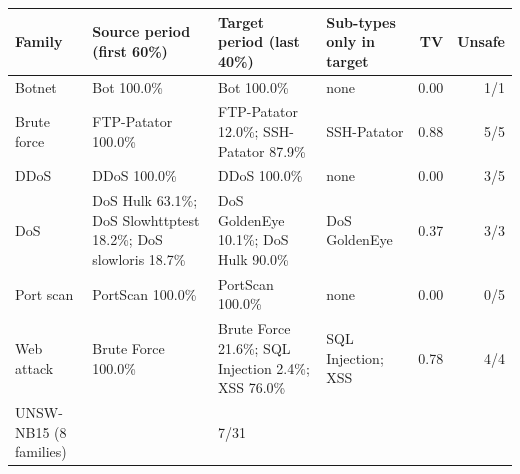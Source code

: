 \begin{tabular}{l>{\raggedright}p{3.2cm}>{\raggedright}p{4.0cm}>{\raggedright}p{2.6cm}rr}
\toprule
Family & Source period (first 60\%) & Target period (last 40\%) & Sub-types only in target & TV & Unsafe \\
\midrule
Botnet & Bot 100.0\% & Bot 100.0\% & none & 0.00 & 1/1 \\
Brute force & FTP-Patator 100.0\% & FTP-Patator 12.0\%; SSH-Patator 87.9\% & SSH-Patator & 0.88 & 5/5 \\
DDoS & DDoS 100.0\% & DDoS 100.0\% & none & 0.00 & 3/5 \\
DoS & DoS Hulk 63.1\%; DoS Slowhttptest 18.2\%; DoS slowloris 18.7\% & DoS GoldenEye 10.1\%; DoS Hulk 90.0\% & DoS GoldenEye & 0.37 & 3/3 \\
Port scan & PortScan 100.0\% & PortScan 100.0\% & none & 0.00 & 0/5 \\
Web attack & Brute Force 100.0\% & Brute Force 21.6\%; SQL Injection 2.4\%; XSS 76.0\% & SQL Injection; XSS & 0.78 & 4/4 \\
\midrule
UNSW-NB15 (8 families) & \multicolumn{4}{l}{no sub-type labels} & 7/31 \\
\bottomrule
\end{tabular}
